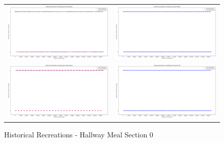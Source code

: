 \begin{figure}
  \begin{tabular}{cc}
    {\includegraphics[width = 3in]{images/results/Historical_hallway_M0_Duckett.png}} &
    {\includegraphics[width = 3in]{images/results/Historical_hallway_M0_FreMEn.png}} \\
    {\includegraphics[width = 3in]{images/results/Historical_hallway_M0_Gaussian.png}} &
    {\includegraphics[width = 3in]{images/results/Historical_hallway_M0_HyT-EM.png}} \\
  \end{tabular}
  \caption{Historical Recreations - Hallway Meal Section 0}
\end{figure}

